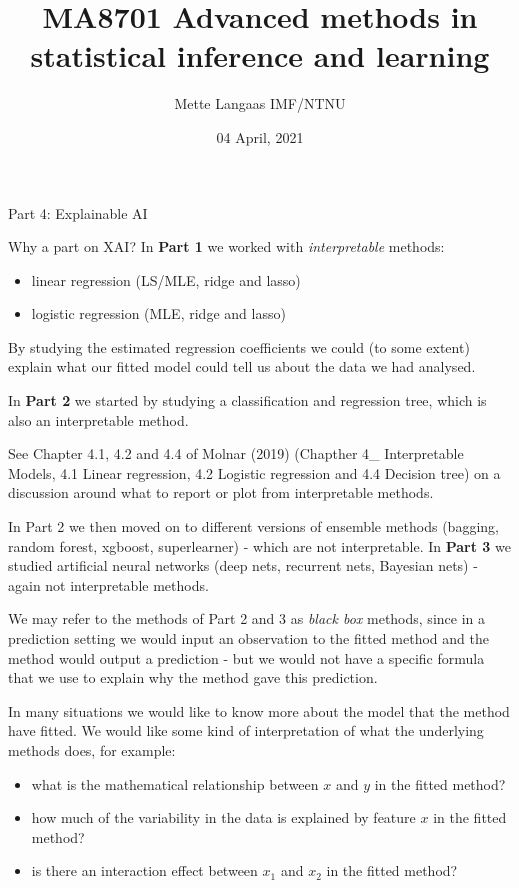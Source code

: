 \documentclass[
  ignorenonframetext,
]{beamer}
\title{MA8701 Advanced methods in statistical inference and learning}
\author{Mette Langaas IMF/NTNU}
\date{04 April, 2021}
\providecommand{\tightlist}{%
  \setlength{\itemsep}{0pt}\setlength{\parskip}{0pt}}
\begin{document}
\frame{\titlepage}

\begin{frame}{Part 4: Explainable AI}
\protect\hypertarget{part-4-explainable-ai}{}
\begin{block}{Why a part on XAI?}
\protect\hypertarget{why-a-part-on-xai}{}
In \textbf{Part 1} we worked with \emph{interpretable} methods:

\begin{itemize}
\tightlist
\item
  linear regression (LS/MLE, ridge and lasso)
\item
  logistic regression (MLE, ridge and lasso)
\end{itemize}

By studying the estimated regression coefficients we could (to some
extent) explain what our fitted model could tell us about the data we
had analysed.

In \textbf{Part 2} we started by studying a classification and
regression tree, which is also an interpretable method.

See Chapter 4.1, 4.2 and 4.4 of Molnar (2019) (Chapther 4\_
Interpretable Models, 4.1 Linear regression, 4.2 Logistic regression and
4.4 Decision tree) on a discussion around what to report or plot from
interpretable methods.

In Part 2 we then moved on to different versions of ensemble methods
(bagging, random forest, xgboost, superlearner) - which are not
interpretable. In \textbf{Part 3} we studied artificial neural networks
(deep nets, recurrent nets, Bayesian nets) - again not interpretable
methods.

We may refer to the methods of Part 2 and 3 as \emph{black box} methods,
since in a prediction setting we would input an observation to the
fitted method and the method would output a prediction - but we would
not have a specific formula that we use to explain why the method gave
this prediction.

In many situations we would like to know more about the model that the
method have fitted. We would like some kind of interpretation of what
the underlying methods does, for example:

\begin{itemize}
\tightlist
\item
  what is the mathematical relationship between \(x\) and \(y\) in the
  fitted method?
\item
  how much of the variability in the data is explained by feature \(x\)
  in the fitted method?
\item
  is there an interaction effect between \(x_1\) and \(x_2\) in the
  fitted method?
\end{itemize}


\end{block}
\end{frame}
\end{document}
